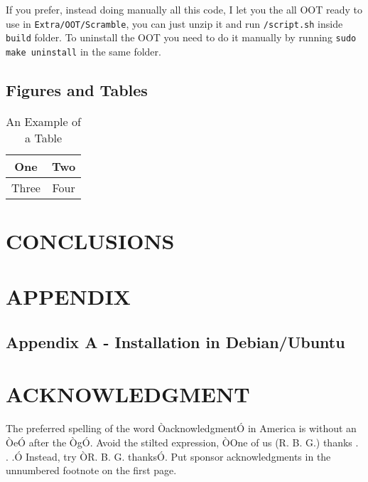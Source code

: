 \documentclass[a4paper, 10pt, conference]{ieeeconf}      %
\begin{document}
If you prefer, instead doing manually all this code, I let you the all OOT ready to use in \verb|Extra/OOT/Scramble|, you can just unzip it and run \verb|/script.sh| inside \verb|build| folder. To uninstall the OOT you need to do it manually by running \verb|sudo make uninstall| in the same folder.

\subsection{Figures and Tables}

\begin{table}[h]
\caption{An Example of a Table}
\label{table_example}
\begin{center}
\begin{tabular}{|c||c|}
\hline
One & Two\\
\hline
Three & Four\\
\hline
\end{tabular}
\end{center}
\end{table}

\section{CONCLUSIONS}



\addtolength{\textheight}{-12cm}   

\section*{APPENDIX}
\subsection{Appendix A - Installation in Debian/Ubuntu}



\section*{ACKNOWLEDGMENT}

The preferred spelling of the word ÒacknowledgmentÓ in America is without an ÒeÓ after the ÒgÓ. Avoid the stilted expression, ÒOne of us (R. B. G.) thanks . . .Ó  Instead, try ÒR. B. G. thanksÓ. Put sponsor acknowledgments in the unnumbered footnote on the first page.



\end{document}
